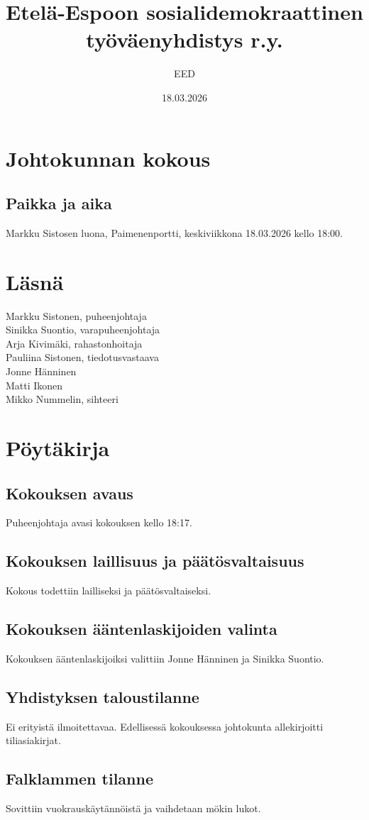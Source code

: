 \documentclass[a4paper,12pt]{article}
\title{Etelä-Espoon sosialidemokraattinen työväenyhdistys r.y.}
\author{EED}
\date{18.03.2026}
\begin{document}
\maketitle
\tableofcontents
\section*{Johtokunnan kokous}
\subsection*{Paikka ja aika}
Markku Sistosen luona, Paimenenportti, keskiviikkona 18.03.2026 kello 18:00.
\section*{Läsnä}
Markku Sistonen, puheenjohtaja \\
Sinikka Suontio, varapuheenjohtaja \\
Arja Kivimäki, rahastonhoitaja \\
Pauliina Sistonen, tiedotusvastaava \\
Jonne Hänninen \\
Matti Ikonen \\
Mikko Nummelin, sihteeri
\section*{Pöytäkirja}
\subsection{Kokouksen avaus}
Puheenjohtaja avasi kokouksen kello 18:17.
\subsection{Kokouksen laillisuus ja päätösvaltaisuus}
Kokous todettiin lailliseksi ja päätösvaltaiseksi.
\subsection{Kokouksen ääntenlaskijoiden valinta}
Kokouksen ääntenlaskijoiksi valittiin Jonne Hänninen ja Sinikka Suontio.
\subsection{Yhdistyksen taloustilanne}
Ei erityistä ilmoitettavaa. Edellisessä kokouksessa johtokunta allekirjoitti tiliasiakirjat.
\subsection{Falklammen tilanne}
Sovittiin vuokrauskäytännöistä ja vaihdetaan mökin lukot.
\end{document}
